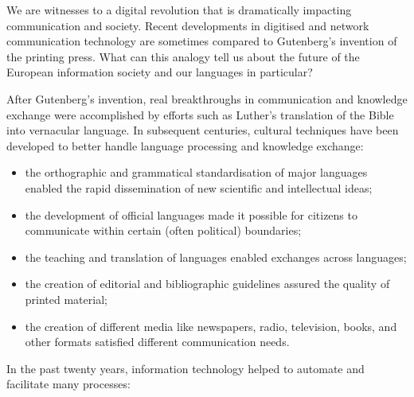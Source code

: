 
\begin{multicols}{2}

We are witnesses to a digital revolution that is dramatically impacting communication and society. Recent developments in digitised and network communication technology are sometimes compared to Gutenberg’s invention of the printing press. What can this analogy tell us about the future of the European information society and our languages in particular?


After Gutenberg’s invention, real breakthroughs in communication and knowledge exchange were accomplished by efforts such as Luther’s translation of the Bible into vernacular language. In subsequent centuries, cultural techniques have been developed to better handle language processing and knowledge exchange:

\begin{itemize}
\item the orthographic and grammatical standardisation of major languages enabled the rapid dissemination of new scientific and intellectual ideas;
\item the development of official languages made it possible for citizens to communicate within certain (often political) boundaries;
\item the teaching and translation of languages enabled exchanges across languages;
\item the creation of editorial and bibliographic guidelines assured the quality of printed material;
\item the creation of different media like newspapers, radio, television, books, and other formats satisfied different communication needs. 
\end{itemize}

In the past twenty years, information technology helped to automate and facilitate many processes:


\end{multicols}
